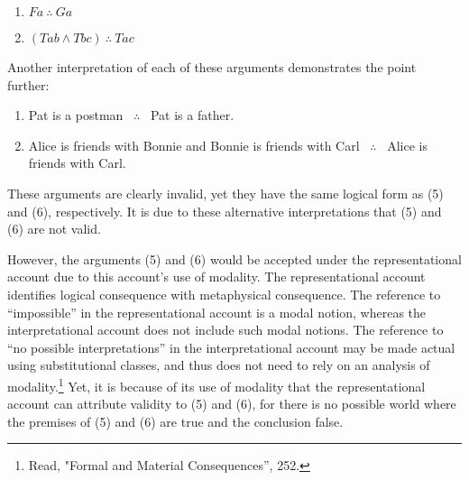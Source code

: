 \begin{enumerate}[leftmargin=42] 
\def\labelenumi{(\arabic{enumi})}
\setcounter{enumi}{6}
\item
  $Fa \ \therefore \ Ga$ 
\item 
  $ (Tab \land Tbc) \ \therefore \ Tac $
\end{enumerate}

\noindent Another interpretation of each of these arguments demonstrates the point further:

\begin{enumerate}[leftmargin=42] 
\def\labelenumi{(\arabic{enumi})}
\setcounter{enumi}{8}
\item
  Pat is a postman \ $\therefore$ \ Pat is a father.
\item 
  Alice is friends with Bonnie and Bonnie is friends with Carl \ $\therefore$ \ Alice is friends with Carl.
\end{enumerate}

\noindent These arguments are clearly invalid, yet they have the same logical form
as (5) and (6), respectively. It is due to these alternative
interpretations that (5) and (6) are not valid.

However, the arguments (5) and (6) would be accepted under the
representational account due to this account's use of modality. The
representational account identifies logical consequence with
metaphysical consequence. The reference to ``impossible'' in the
representational account is a modal notion, whereas the interpretational
account does not include such modal notions. The reference to ``no
possible interpretations'' in the interpretational account may be made
actual using substitutional classes, and thus does not need to rely on
an analysis of modality.\footnote{Read, "Formal and Material
  Consequences'', 252.} Yet, it is because of its use of modality that
the representational account can attribute validity to (5) and (6), for
there is no possible world where the premises of (5) and (6) are true
and the conclusion false.


